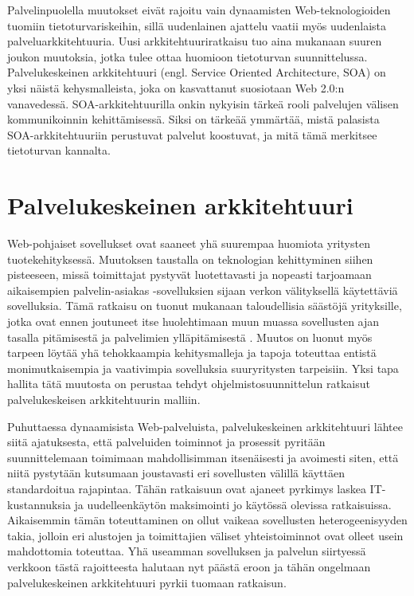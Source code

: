 Palvelinpuolella muutokset eivät rajoitu vain dynaamisten Web-\-teknologioiden tuomiin
tietoturvariskeihin, sillä uudenlainen ajattelu vaatii myös uudenlaista
palveluarkkitehtuuria. Uusi arkkitehtuuriratkaisu tuo aina mukanaan suuren
joukon muutoksia, jotka tulee ottaa huomioon tietoturvan suunnittelussa.
Palvelukeskeinen arkkitehtuuri (engl. Service Ori\-ent\-ed Architecture, SOA) on
yksi näistä kehysmalleista, joka on kasvattanut suosiotaan Web 2.0:n
vanavedessä. SOA-arkkitehtuurilla onkin nykyisin tärkeä rooli palvelujen
välisen kommunikoinnin kehittämisessä. Siksi on tärkeää ymmärtää, mistä
palasista SOA-arkkitehtuuriin perustuvat palvelut koostuvat, ja mitä tämä
merkitsee tietoturvan kannalta.

\section{Palvelukeskeinen arkkitehtuuri}

Web-pohjaiset sovellukset ovat saaneet yhä suurempaa huomiota yritysten
tuotekehityksessä. Muutoksen taustalla on teknologian
kehittyminen siihen pisteeseen, missä toimittajat pystyvät
luotettavasti ja nopeasti tarjoamaan aikaisempien
palvelin-asiakas -sovelluksien sijaan verkon välityksellä käytettäviä sovelluksia. Tämä
ratkaisu on tuonut mukanaan taloudellisia säästöjä yrityksille, jotka ovat ennen
joutuneet itse huolehtimaan muun muassa sovellusten ajan tasalla pitämisestä ja
palvelimien ylläpitämisestä \cite{WEB2}. Muutos on luonut myös tarpeen löytää yhä
tehokkaampia kehitysmalleja ja tapoja toteuttaa entistä monimutkaisempia ja
vaativimpia sovelluksia suuryritysten tarpeisiin. Yksi tapa hallita tätä
muutosta on perustaa tehdyt ohjelmistosuunnittelun ratkaisut palvelukeskeisen
arkkitehtuurin malliin.

Puhuttaessa dynaamisista Web-palveluista, palvelukeskeinen arkkitehtuuri lähtee siitä
ajatuksesta, että palveluiden toiminnot ja prosessit pyritään suunnittelemaan
toimimaan mahdollisimman itsenäisesti ja avoimesti siten, että niitä pystytään
kutsumaan joustavasti eri sovellusten välillä käyttäen standardoitua rajapintaa.
Tähän ratkaisuun ovat ajaneet pyrkimys laskea IT-kustannuksia ja
uudelleenkäytön maksimointi jo käytössä olevissa 
ratkaisuissa. Aikaisemmin tämän toteuttaminen
on ollut vaikeaa sovellusten heterogeenisyyden takia, jolloin eri
alustojen ja toimittajien väliset yhteistoiminnot ovat olleet usein mahdottomia
toteuttaa. Yhä useamman sovelluksen ja palvelun siirtyessä verkkoon tästä
rajoitteesta halutaan nyt päästä eroon ja tähän ongelmaan palvelukeskeinen arkkitehtuuri
pyrkii tuomaan ratkaisun.

